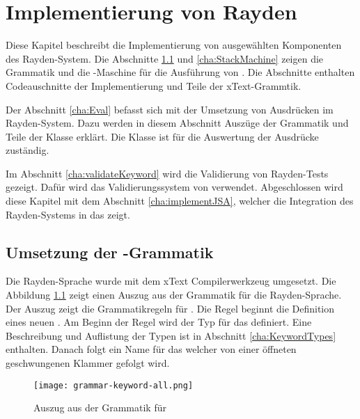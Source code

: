 \chapter{Implementierung von Rayden}
\label{cha:Implementierung}

Diese Kapitel beschreibt die Implementierung von ausgewählten Komponenten des Rayden-System. Die Abschnitte \ref{cha:KeywordGrammar} und \ref{cha:StackMachine} zeigen die Grammatik und die -Maschine für die Ausführung von . Die Abschnitte enthalten Codeauschnitte der Implementierung und Teile der xText-Grammtik.

\SuperPar
Der Abschnitt \ref{cha:Eval} befasst sich mit der Umsetzung von Ausdrücken im Rayden-System. Dazu werden in diesem Abschnitt Auszüge der Grammatik und Teile der  Klasse erklärt. Die Klasse  ist für die Auswertung der Ausdrücke zuständig. 

\SuperPar
Im Abschnitt \ref{cha:validateKeyword} wird die Validierung von Rayden-Tests gezeigt. Dafür wird das Validierungssystem von  verwendet. Abgeschlossen wird diese Kapitel mit dem Abschnitt \ref{cha:implementJSA}, welcher die Integration des Rayden-Systems in das  zeigt. 


\section{Umsetzung der -Grammatik}
\label{cha:KeywordGrammar}

Die Rayden-Sprache wurde mit dem xText \cite{xtext} Compilerwerkzeug umgesetzt. Die Abbildung \ref{fig:keywordGrammar} zeigt einen Auszug aus der Grammatik für die Rayden-Sprache. Der Auszug zeigt die Grammatikregeln für . Die Regel  beginnt die Definition eines neuen . Am Beginn der Regel wird der Typ für das  definiert. Eine Beschreibung und Auflistung der Typen ist in Abschnitt \ref{cha:KeywordTypes} enthalten. Danach folgt ein Name für das  welcher von einer öffneten geschwungenen Klammer gefolgt wird.

\begin{figure}
\centering
\texttt{[image: grammar-keyword-all.png]}
\caption{Auszug aus der Grammatik für }
\label{fig:keywordGrammar}
\end{figure}

